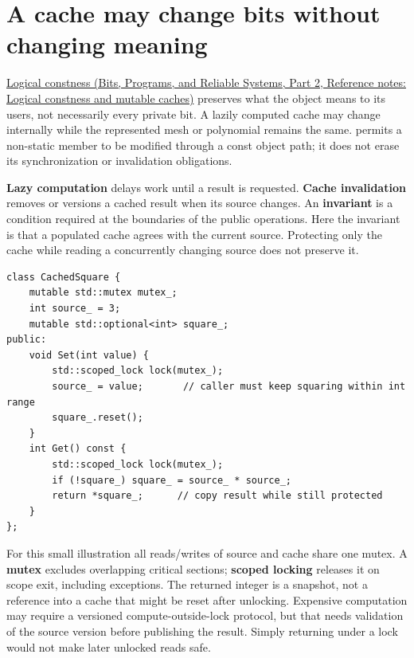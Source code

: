 \section{A cache may change bits without changing meaning}\label{05-engine-i-ch003-a-cache-may-change-bits-without-changing-meaning}

\hypertarget{05-engine-i-ch003-a-cache-may-change-bits-without-changing-meaning}{}

\href{../01-Bits-Programs-and-Reliable-Systems-P02/main.pdf\#nameddest=appendix-f5593256bcaf}{Logical constness (Bits, Programs, and Reliable Systems, Part 2, Reference notes: Logical constness and mutable caches)} preserves what the object means to its users, not necessarily every private bit. A lazily computed cache may change internally while the represented mesh or polynomial remains the same.  permits a non-static member to be modified through a const object path; it does not erase its synchronization or invalidation obligations.

\textbf{Lazy computation} delays work until a result is requested. \textbf{Cache invalidation} removes or versions a cached result when its source changes. An \textbf{invariant} is a condition required at the boundaries of the public operations. Here the invariant is that a populated cache agrees with the current source. Protecting only the cache while reading a concurrently changing source does not preserve it.

\begin{verbatim}
class CachedSquare {
    mutable std::mutex mutex_;
    int source_ = 3;
    mutable std::optional<int> square_;
public:
    void Set(int value) {
        std::scoped_lock lock(mutex_);
        source_ = value;       // caller must keep squaring within int range
        square_.reset();
    }
    int Get() const {
        std::scoped_lock lock(mutex_);
        if (!square_) square_ = source_ * source_;
        return *square_;      // copy result while still protected
    }
};
\end{verbatim}

For this small illustration all reads/writes of source and cache share one mutex. A \textbf{mutex} excludes overlapping critical sections; \textbf{scoped locking} releases it on scope exit, including exceptions. The returned integer is a snapshot, not a reference into a cache that might be reset after unlocking. Expensive computation may require a versioned compute-outside-lock protocol, but that needs validation of the source version before publishing the result. Simply returning  under a lock would not make later unlocked reads safe.

